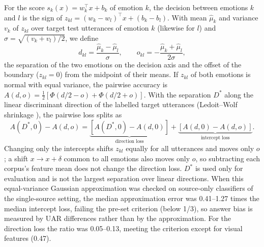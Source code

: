 For the score $s_k(x)=w_k^\top x+b_k$ of emotion $k$, the decision between emotions $k$ and $l$ is the sign of $z_{kl}=(w_k-w_l)^\top x+(b_k-b_l)$. With mean $\hat\mu_k$ and variance $v_k$ of $z_{kl}$ over target test utterances of emotion $k$ (likewise for $l$) and $\sigma=\sqrt{(v_k+v_l)/2}$, we define
\begin{equation}
d_{kl}=\frac{\hat\mu_k-\hat\mu_l}{\sigma},\qquad o_{kl}=-\frac{\hat\mu_k+\hat\mu_l}{2\sigma},
\end{equation}
the separation of the two emotions on the decision axis and the offset of the boundary ($z_{kl}=0$) from the midpoint of their means. If $z_{kl}$ of both emotions is normal with equal variance, the pairwise accuracy is $A(d,o)=\tfrac12[\Phi(d/2-o)+\Phi(d/2+o)]$. With the separation $D^{*}$ along the linear discriminant direction of the labelled target utterances (Ledoit--Wolf shrinkage \cite{ledoit2004}), the pairwise loss splits as
\begin{equation}
A(D^{*},0)-A(d,o)=\underbrace{[A(D^{*},0)-A(d,0)]}_{\text{direction loss}}+\underbrace{[A(d,0)-A(d,o)]}_{\text{intercept loss}}.
\end{equation}
Changing only the intercepts shifts $z_{kl}$ equally for all utterances and moves only $o$; a shift $x\to x+\delta$ common to all emotions also moves only $o$, so subtracting each corpus's feature mean does not change the direction loss. $D^{*}$ is used only for evaluation and is not the largest separation over linear directions. When this equal-variance Gaussian approximation was checked on source-only classifiers of the single-source setting, the median approximation error was 0.41--1.27 times the median intercept loss, failing the pre-set criterion (below 1/3), so answer bias is measured by UAR differences rather than by the approximation. For the direction loss the ratio was 0.05--0.13, meeting the criterion except for visual features (0.47).

